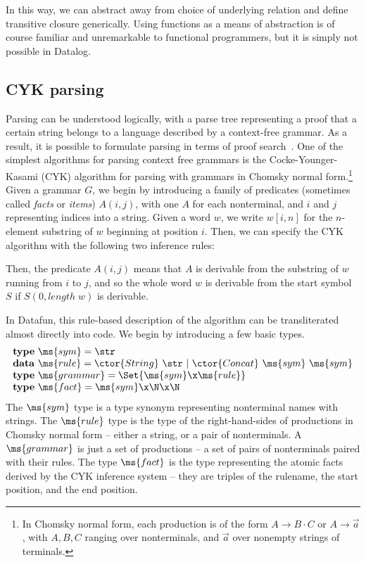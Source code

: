 In this way, we can abstract away from choice of underlying relation and define
transitive closure generically. Using functions as a means of abstraction is of
course familiar and unremarkable to functional programmers, but it is simply not
possible in Datalog.


\subsection{CYK parsing}
Parsing can be understood logically, with a parse tree representing a
proof that a certain string belongs to a language described by a
context-free grammar. As a result, it is possible to formulate parsing
in terms of proof search~\cite{deductive-parsing}. One of the
simplest algorithms for parsing context free grammars is the
Cocke-Younger-Kasami (CYK) algorithm for parsing with grammars in
Chomsky normal form.\footnote{In Chomsky normal form, each production
  is of the form $A \to B \cdot C$ or $A \to \vec{a}$, with $A,B,C$
  ranging over nonterminals, and $\vec{a}$ over nonempty strings of
  terminals.}  Given a grammar $G$, we begin by introducing a family
of predicates (sometimes called \emph{facts} or \emph{items}) $A(i,j)$,
with one $A$ for each nonterminal, and $i$ and $j$ representing
indices into a string. Given a word $w$, we write $w[i,n]$ for the
$n$-element substring of $w$ beginning at position $i$. Then, we can
specify the CYK algorithm with the following two inference rules:
Then, the predicate $A(i,j)$ means that $A$ is derivable from the
substring of $w$ running from $i$ to $j$, and so the whole word $w$ is
derivable from the start symbol $S$ if $S(0, \mathit{length}\;w)$ is
derivable.

In Datafun, this rule-based description of the algorithm can be
transliterated almost directly into code. We begin by introducing a
few basic types.
\[\begin{array}{l}
\mathbf{type}~\ms{sym} = \str\\
\mathbf{data}~\ms{rule} = \ctor{String}~\str ~|~ \ctor{Concat}~\ms{sym}~\ms{sym}\\
\mathbf{type}~\ms{grammar} = \Set{\ms{sym} \x \ms{rule}}\\
\mathbf{type}~\ms{fact} = \ms{sym} \x \N \x \N\\
\end{array}\]
The $\ms{sym}$ type is a type synonym representing nonterminal names
with strings. The $\ms{rule}$ type is the type of the right-hand-sides
of productions in Chomsky normal form -- either a string, or a pair of
nonterminals. A $\ms{grammar}$ is just a set of productions -- a set
of pairs of nonterminals paired with their rules. The type $\ms{fact}$
is the type representing the atomic facts derived by the CYK inference
system -- they are triples of the rulename, the start position, and
the end position.

